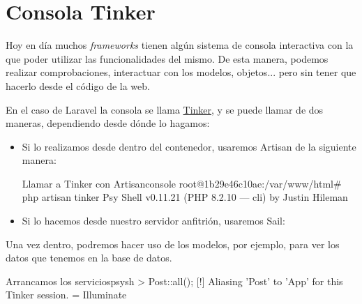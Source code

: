 \chapter{Consola Tinker}

Hoy en día muchos \textit{frameworks} tienen algún sistema de consola interactiva con la que poder utilizar las funcionalidades del mismo. De esta manera, podemos realizar comprobaciones, interactuar con los modelos, objetos... pero sin tener que hacerlo desde el código de la web.

En el caso de Laravel la consola se llama \href{https://laravel.com/docs/10.x/artisan#tinker}{Tinker}, y se puede llamar de dos maneras, dependiendo desde dónde lo hagamos:
\begin{itemize}
    \item Si lo realizamos desde dentro del contenedor, usaremos Artisan de la siguiente manera:
\begin{mycode}{Llamar a Tinker con Artisan}{console}{}
root@1b29e46c10ae:/var/www/html# php artisan tinker
Psy Shell v0.11.21 (PHP 8.2.10 — cli) by Justin Hileman
\end{mycode}

    \item Si lo hacemos desde nuestro servidor anfitrión, usaremos Sail:
\end{itemize}

Una vez dentro, podremos hacer uso de los modelos, por ejemplo, para ver los datos que tenemos en la base de datos.

\begin{mycode}{Arrancamos los servicios}{psysh}{}
> Post::all();
[!] Aliasing 'Post' to 'App\Models\Post' for this Tinker session.
= Illuminate\Database\Eloquent{}
\end{mycode}